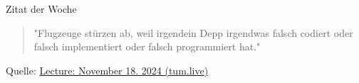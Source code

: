 \documentclass[
  german,            %
  aspectratio=169,    %
]{tumbeamer}
\begin{document}
\begin{frame}[c]{}{}
  \begin{center}
    \vspace{0.5cm}
    \begin{block}{Zitat der Woche}
      \vspace{0.5cm}
      \begin{quote}
        "Flugzeuge stürzen ab, weil irgendein Depp irgendwas falsch codiert oder falsch implementiert oder falsch programmiert hat."    
        \vspace{0.5cm}
      \end{quote}
      \vspace{0.5cm}
    \end{block}
    \vspace{0.5cm}
    Quelle: \href{https://tum.live/w/ws24EidR/50021?t=2268}{Lecture: November 18. 2024 (tum.live)}
  \end{center}
\end{frame}
\end{document}
